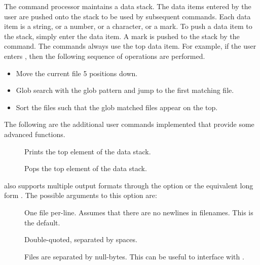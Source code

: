 The command processor maintains a data stack. The data items entered
by the user are pushed onto the stack to be used by subsequent
commands. Each data item is a string, or a number, or a character, or
a mark. To push a data item to the stack, simply enter the data
item. A mark is pushed to the stack by the  command. The
commands always use the top data item. For example, if the user enters
, then the following sequence of operations
are performed.

\begin{itemize}

\item Move the current file 5 positions down.

\item Glob search with the glob pattern  and jump to the
first matching file.

\item Sort the files such that the glob matched files appear on the
top.

\end{itemize}

The following are the additional user commands implemented that
provide some advanced functions.

\begin{description}

\item [] Prints the top element of the data stack.

\item [] Pops the top element of the data stack.

\end{description}

 also supports multiple output formats through the option
 or the equivalent long form . The possible
arguments to this option are:

\begin{description}

\item [] One file per-line. Assumes that there are no newlines
in filenames. This is the default.

\item [] Double-quoted, separated by spaces.

\item [] Files are separated by null-bytes. This can be useful
to interface with .

\end{description}

